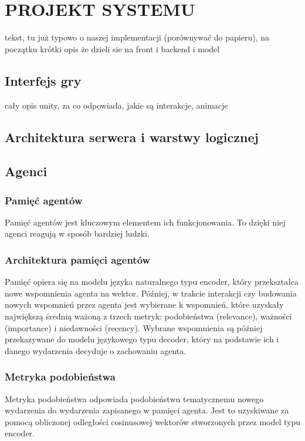 \chapter{PROJEKT SYSTEMU}

tekst, tu już typowo o naszej implementacji (porównywać do papieru), na początku krótki opis że dzieli sie na front i backend i model


\section{Interfejs gry}

cały opis unity, za co odpowiada, jakie są interakcje, animacje



\section{Architektura serwera i warstwy logicznej}
\label{sec:architektura_serwera}

\section{Agenci}

\subsection{Pamięć agentów}
Pamięć agentów jest kluczowym elementem ich funkcjonowania.
To dzięki niej agenci reagują w sposób bardziej ludzki.

\subsection*{Architektura pamięci agentów}
Pamięć opiera się na modelu języka naturalnego typu encoder, który przekształca
nowe wspomnienia agenta na wektor. Później, w trakcie interakcji czy budowania nowych
wspomnień przez agenta jest wybierane k wspomnień, które uzyskały największą średnią
ważoną z trzech metryk: podobieństwa (relevance), ważności (importance) i niedawności (recency).
Wybrane wspomnienia są później przekazywane do modelu językowego typu decoder, który na
podstawie ich i danego wydarzenia decyduje o zachowaniu agenta.

\subsection*{Metryka podobieństwa}
Metryka podobieństwa odpowiada podobieństwu tematycznemu nowego wydarzenia do
wydarzenia zapisanego w pamięci agenta. Jest to uzyskiwane za pomocą obliczonej
odległości cosinusowej wektorów stworzonych przez model typu encoder.


